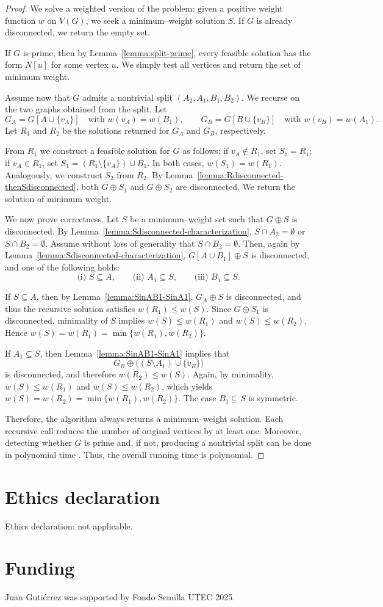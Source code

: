 \documentclass[11pt]{article}
\theoremstyle{definition}
\begin{document}
\begin{proof}
We solve a weighted version of the problem: given a positive weight function
$w$ on $V(G)$, we seek a minimum--weight solution $S$.
If $G$ is already disconnected, we return the empty set.

If $G$ is prime, then by Lemma~\ref{lemma:split-prime}, every feasible solution
has the form $N[u]$ for some vertex $u$.
We simply test all vertices and return the set of minimum weight.

Assume now that $G$ admits a nontrivial split $(A_2,A_1,B_1,B_2)$.
We recurse on the two graphs obtained from the split.
Let
\[
G_A = G[A\cup\{v_A\}] \quad\text{with } w(v_A)=w(B_1),
\qquad
G_B = G[B\cup\{v_B\}] \quad\text{with } w(v_B)=w(A_1).
\]
Let $R_1$ and $R_2$ be the solutions returned for $G_A$ and $G_B$, respectively.

From $R_1$ we construct a feasible solution for $G$ as follows:
if $v_A\notin R_1$, set $S_1=R_1$;
if $v_A\in R_1$, set $S_1=(R_1\setminus\{v_A\})\cup B_1$.
In both cases, $w(S_1)=w(R_1)$.
Analogously, we construct $S_2$ from $R_2$.
By Lemma~\ref{lemma:Rdisconnected-thenSdisconnected},
both $G\oplus S_1$ and $G\oplus S_2$ are disconnected.
We return the solution of minimum weight.

We now prove correctness.
Let $S$ be a minimum--weight set such that $G\oplus S$ is disconnected.
By Lemma~\ref{lemma:Sdisconnected-characterization},
$S\cap A_2=\emptyset$ or $S\cap B_2=\emptyset$.
Assume without loss of generality that $S\cap B_2=\emptyset$.
Then, again by Lemma~\ref{lemma:Sdisconnected-characterization},
$G[A\cup B_1]\oplus S$ is disconnected, and one of the following holds:
\[
\text{(i) } S\subseteq A,\qquad
\text{(ii) } A_1\subseteq S,\qquad
\text{(iii) } B_1\subseteq S.
\]

If $S\subseteq A$, then by Lemma~\ref{lemma:SinAB1-SinA1},
$G_A\oplus S$ is disconnected, and thus the recursive solution satisfies
$w(R_1)\le w(S)$.
Since $G\oplus S_1$ is disconnected, minimality of $S$ implies
$w(S)\le w(R_1)$ and $w(S)\le w(R_2)$.
Hence $w(S)=w(R_1)=\min\{w(R_1),w(R_2)\}$.

If $A_1\subseteq S$, then Lemma~\ref{lemma:SinAB1-SinA1} implies that
\[
G_B\oplus\bigl((S\setminus A_1)\cup\{v_B\}\bigr)
\]
is disconnected, and therefore $w(R_2)\le w(S)$.
Again, by minimality, $w(S)\le w(R_1)$ and $w(S)\le w(R_2)$, which yields
$w(S)=w(R_2)=\min\{w(R_1),w(R_2)\}$.
The case $B_1\subseteq S$ is symmetric.

Therefore, the algorithm always returns a minimum--weight solution.
Each recursive call reduces the number of original vertices by at least one.
Moreover, detecting whether $G$ is prime and, if not, producing a nontrivial
split can be done in polynomial time \cite[Problem~1]{Cunningham1982}.
Thus, the overall running time is polynomial.
\end{proof}


\section*{Ethics declaration}
Ethics declaration: not applicable.

\section*{Funding}
Juan Gutiérrez was supported by Fondo Semilla UTEC 2025. 





\end{document}
